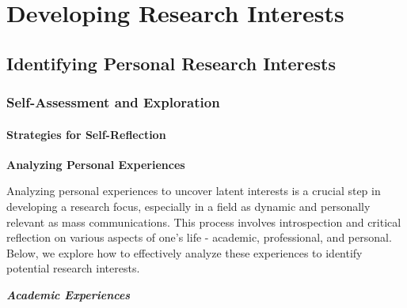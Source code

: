 \documentclass[
]{book}
\begin{document}
\hypertarget{developing-research-interests}{%
\chapter*{Developing Research Interests}\label{developing-research-interests}}

\hypertarget{identifying-personal-research-interests}{%
\section*{Identifying Personal Research Interests}\label{identifying-personal-research-interests}}

\hypertarget{self-assessment-and-exploration}{%
\subsection*{Self-Assessment and Exploration}\label{self-assessment-and-exploration}}

\hypertarget{strategies-for-self-reflection}{%
\subsubsection*{Strategies for Self-Reflection}\label{strategies-for-self-reflection}}

\textbf{Analyzing Personal Experiences}

Analyzing personal experiences to uncover latent interests is a crucial step in developing a research focus, especially in a field as dynamic and personally relevant as mass communications. This process involves introspection and critical reflection on various aspects of one's life - academic, professional, and personal. Below, we explore how to effectively analyze these experiences to identify potential research interests.

\textbf{\emph{Academic Experiences}}
\end{document}
